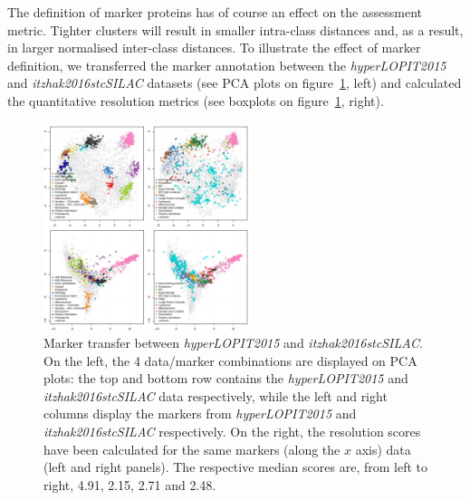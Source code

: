 \documentclass[12pt]{article}\usepackage[]{graphicx}\usepackage[]{color}
\begin{document}
The definition of marker proteins has of course an effect on the
assessment metric. Tighter clusters will result in smaller intra-class
distances and, as a result, in larger normalised inter-class
distances. To illustrate the effect of marker definition, we
transferred the marker annotation between the \textit{hyperLOPIT2015}
and \textit{itzhak2016stcSILAC} datasets (see PCA plots on
figure~\ref{fig:mrkswtch}, left) and calculated the quantitative
resolution metrics (see boxplots on figure~\ref{fig:mrkswtch}, right).

\begin{figure}[h]
  \centering
  \includegraphics[width = 0.54\textwidth]{mrkswtch-pca.pdf}
  \caption{Marker transfer between \textit{hyperLOPIT2015} and
    \textit{itzhak2016stcSILAC}. On the left, the 4 data/marker
    combinations are displayed on PCA plots: the top and bottom row
    contains the \textit{hyperLOPIT2015} and
    \textit{itzhak2016stcSILAC} data respectively, while the left and
    right columns display the markers from \textit{hyperLOPIT2015} and
    \textit{itzhak2016stcSILAC} respectively. On the right, the
    resolution scores have been calculated for the same markers (along
    the $x$ axis) data (left and right panels). The respective median
    scores are, from left to right, 4.91, 2.15, 2.71 and 2.48.}
  \label{fig:mrkswtch}
\end{figure}
\end{document}
